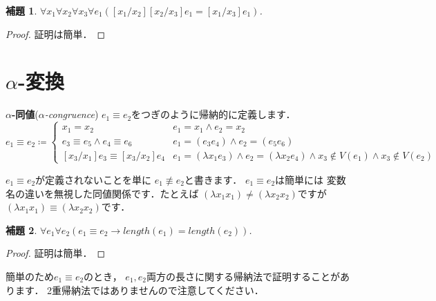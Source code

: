 \documentclass{ltjsbook}%
\newtheorem{lemma}{補題}[section]%
\newcommand\term[2]{\textbf{#1}{(\textit{#2})}}%
\begin{document}
\begin{lemma}%
  \label{lemma:subst_trans}%
  $\forall\mathit{x}_1\forall\mathit{x}_2\forall\mathit{x}_3\forall\mathit{e}_1%
  ([\mathit{x}_1/\mathit{x}_2][\mathit{x}_2/\mathit{x}_3]\mathit{e}_1%
  =[\mathit{x}_1/\mathit{x}_3]\mathit{e}_1)$.%
\end{lemma}%
\begin{proof}%
  証明は簡単．%
\end{proof}%
\section{$\alpha$-変換}%
\label{sect:alpha}%
\term{$\alpha$-同値}{$\alpha$-congruence}%
$\mathit{e}_1\equiv\mathit{e}_2$をつぎのように帰納的に定義します．%
\begin{equation}%
  \mathit{e}_1\equiv\mathit{e}_2 \coloneqq \begin{cases}%
    \mathit{x}_1 = \mathit{x}_2%
    & \mathit{e}_1 = \mathit{x}_1%
    \land \mathit{e}_2 = \mathit{x}_2\\%
    \mathit{e}_3\equiv\mathit{e}_5\land\mathit{e}_4\equiv\mathit{e}_6%
    & \mathit{e}_1 = (\mathit{e}_3\mathit{e}_4)%
    \land \mathit{e}_2 = (\mathit{e}_5\mathit{e}_6)\\%
    {}[\mathit{x}_3/\mathit{x}_1]\mathit{e}_3%
    \equiv{}[\mathit{x}_3/\mathit{x}_2]\mathit{e}_4%
    & \mathit{e}_1 = (\lambda\mathit{x}_1\mathit{e}_3)%
    \land \mathit{e}_2 = (\lambda\mathit{x}_2\mathit{e}_4)%
    \land \mathit{x}_3\not\in V(\mathit{e}_1)%
    \land \mathit{x}_3\not\in V(\mathit{e}_2)%
  \end{cases}%
\end{equation}%
\par$\mathit{e}_1\equiv\mathit{e}_2$が定義されないことを単に%
$\mathit{e}_1\not\equiv\mathit{e}_2$と書きます．%
$\mathit{e}_1\equiv\mathit{e}_2$は簡単には%
変数名の違いを無視した同値関係です．たとえば%
$(\lambda x_1x_1)\neq(\lambda x_2x_2)$ですが%
$(\lambda x_1x_1)\equiv(\lambda x_2x_2)$です．%
\begin{lemma}%
  \label{lemma:alpha_len}%
  $\forall\mathit{e}_1\forall\mathit{e}_2%
  (\mathit{e}_1\equiv\mathit{e}_2\rightarrow%
  length(\mathit{e}_1)=length(\mathit{e}_2))$.%
\end{lemma}%
\begin{proof}%
  証明は簡単．%
\end{proof}%
簡単のため$\mathit{e}_1\equiv\mathit{e}_2$のとき，%
$\mathit{e}_1,\mathit{e}_2$両方の長さに関する帰納法で証明することがあります．%
2重帰納法ではありませんので注意してください．%
\end{document}
